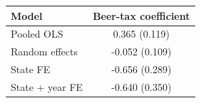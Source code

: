 \begin{tabular}{lc}
\textbf{Model} & \textbf{Beer-tax coefficient} \\ \hline
Pooled OLS & 0.365 (0.119) \\
Random effects & -0.052 (0.109) \\
State FE & -0.656 (0.289) \\
State + year FE & -0.640 (0.350) \\
\end{tabular}
